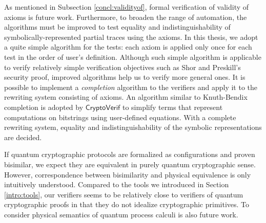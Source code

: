 As mentioned in Subsection \ref{concl:validityof}, 
formal verification of validity of axioms is future work. 
Furthermore, to broaden the
range of automation,
the algorithms must be improved to test equality and
indistinguishability 
of symbolically-represented partial traces
using the axioms. In this thesis,
we adopt a quite simple algorithm for the tests:
each axiom is applied only once for each test
in the order of user's definition.
Although such simple
algorithm is applicable to verify relatively simple
verification 
objectives such as Shor and Preskill's security proof, improved
algorithms help us to verify more general ones.
It is possible to implement a \emph{completion} algorithm to the
verifiers and apply it to the rewriting system consisting of axioms.
An algorithm similar to Knuth-Bendix completion \cite{KnuthBendix1970}
is adopted by $\mathsf{CryptoVerif}$
\cite{Blanchet2008cryptoverif} to simplify terms that represent
computations on bitstrings using user-defined equations.
With a complete rewriting system, equality and indistinguishability
of the symbolic representations are decided.

If quantum cryptographic protocols are formalized as 
configurations and
proven bisimilar, we expect they are equivalent in purely quantum 
cryptographic sense. However, 
correspondence between bisimilarity and physical
equivalence is only intuitively understood.
Compared to the tools we introduced in Section \ref{intro:tools},
our verifiers seems to be relatively close to 
verifiers of quantum cryptographic proofs
in that they do not idealize cryptographic primitives.
To consider physical semantics of quantum process calculi
is also future work.
